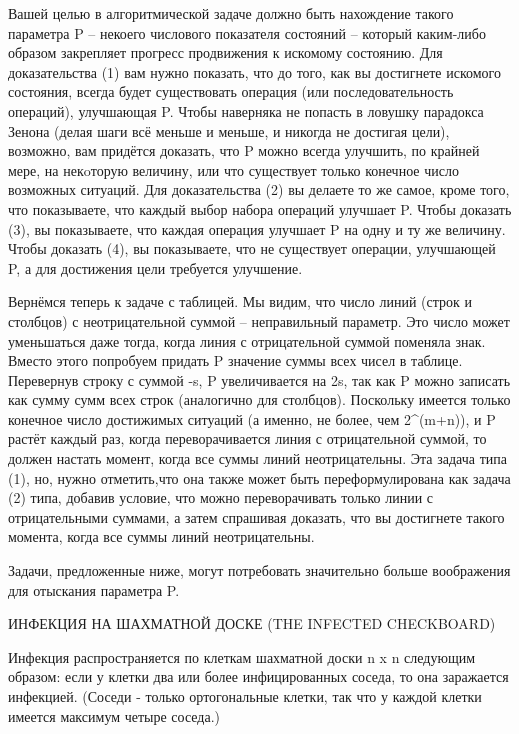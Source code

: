   Вашей целью в алгоритмической задаче должно быть нахождение такого параметра P -- некоего числового показателя состояний -- который каким-либо образом закрепляет прогресс продвижения к искомому состоянию.
   Для доказательства (1) вам нужно показать, что до того, как вы достигнете  искомого состояния, всегда будет существовать операция (или последовательность операций), улучшающая P.  Чтобы наверняка не попасть в ловушку парадокса Зенона (делая шаги всё меньше и меньше, и никогда не достигая цели), возможно, вам придётся доказать, что P можно всегда улучшить, по крайней мере, на некoторую величину, или что существует только конечное число возможных ситуаций.
  Для доказательства (2) вы делаете то же самое, кроме того, что показываете, что каждый выбор набора операций улучшает P.
  Чтобы доказать (3), вы показываете, что каждая операция улучшает P на одну и ту же величину.
  Чтобы доказать (4), вы показываете, что не существует операции, улучшающей P, а для достижения цели требуется улучшение.
   
   Вернёмся теперь к задаче с таблицей. Мы видим, что число линий (строк и столбцов) с неотрицательной суммой -- неправильный параметр. Это число может уменьшаться даже тогда, когда линия с отрицательной суммой поменяла знак. Вместо этого попробуем придать P значение суммы всех чисел в таблице. Перевернув строку с суммой -s,  P увеличивается на 2s, так как P можно записать как сумму сумм всех строк (аналогично для столбцов). Поскольку имеется только конечное число достижимых ситуаций
(а именно, не более, чем 2^(m+n)), и P растёт каждый раз, когда переворачивается линия с отрицательной суммой, то должен настать момент, когда все суммы линий неотрицательны.
   Эта задача типа (1), но, нужно отметить,что она также может быть переформулирована как задача  (2) типа, добавив условие, что можно переворачивать только линии с отрицательными суммами, а затем спрашивая доказать, что вы достигнете такого момента, когда все суммы линий неотрицательны.


 Задачи, предложенные ниже, могут потребовать значительно больше воображения для отыскания параметра P.


ИНФЕКЦИЯ НА ШАХМАТНОЙ ДОСКЕ (THE INFECTED CHECKBOARD)


Инфекция распространяется по клеткам шахматной доски n x n следующим образом: если у клетки два или более инфицированных соседа, то она заражается инфекцией. (Соседи - только ортогональные клетки, так что у каждой клетки имеется максимум четыре соседа.)






